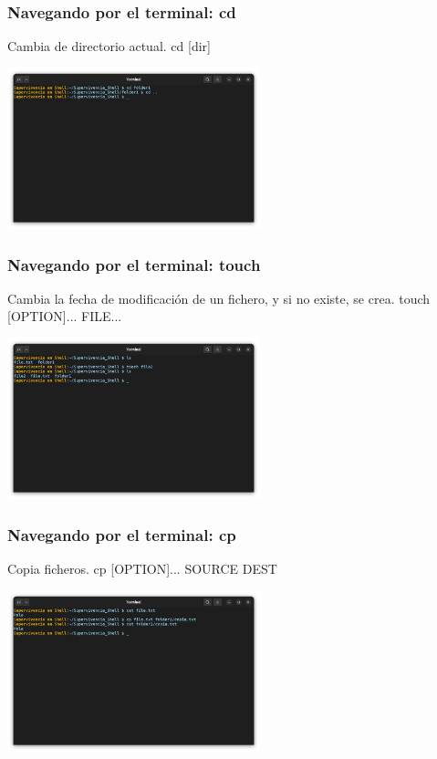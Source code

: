 \documentclass[10pt]{beamer}
\begin{document}
	\begin{frame}
		\frametitle{Navegando por el terminal: cd}
		\begin{alertblock}{Cambia de directorio actual.}
			cd [dir]
		\end{alertblock}
		\begin{center}
			\includegraphics[width=0.55\textwidth]{cd}
		\end{center}
	\end{frame}
	
	\begin{frame}
		\frametitle{Navegando por el terminal: touch}
		\begin{alertblock}{Cambia la fecha de modificación de un fichero, y si no existe, se crea.}
			touch [OPTION]... FILE...
		\end{alertblock}
		\begin{center}
			\includegraphics[width=0.55\textwidth]{touch}
		\end{center}
	\end{frame}
	
	\begin{frame}
		\frametitle{Navegando por el terminal: cp}
		\begin{alertblock}{Copia ficheros.}
			cp [OPTION]... SOURCE DEST
		\end{alertblock}
		\begin{center}
			\includegraphics[width=0.55\textwidth]{cp}
		\end{center}
	\end{frame}	
		
\end{document}
